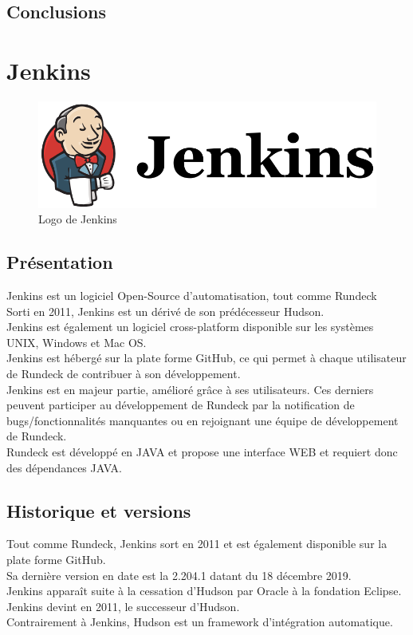 \documentclass[12pt]{article}
\begin{document}
\subsection{Conclusions}

\section{Jenkins}

\begin{figure}[ht]
    \includegraphics[scale=0.5]{images/jenkins.png}
    \caption{Logo de Jenkins}
\end{figure}

\subsection{Présentation}

Jenkins est un logiciel Open-Source d'automatisation, tout comme Rundeck
\\
Sorti en 2011, Jenkins est un dérivé de son prédécesseur Hudson.
\\
Jenkins est également un logiciel cross-platform disponible sur les systèmes UNIX, Windows et Mac OS. 
\\
Jenkins est hébergé sur la plate forme GitHub, ce qui permet à chaque utilisateur de Rundeck de contribuer à son développement. 
\\
Jenkins est en majeur partie, amélioré grâce à ses utilisateurs. Ces derniers peuvent participer au développement de Rundeck par la notification de bugs/fonctionnalités manquantes ou en rejoignant une équipe de développement de Rundeck. 
\\
Rundeck est développé en JAVA et propose une interface WEB et requiert donc des dépendances JAVA.

\subsection{Historique et versions}

Tout comme Rundeck, Jenkins sort en 2011 et est également disponible sur la plate forme GitHub.
\\
Sa dernière version en date est la 2.204.1 datant du 18 décembre 2019.
\\
Jenkins apparaît suite à la cessation d'Hudson par Oracle à la fondation Eclipse. Jenkins devint en 2011, le successeur d'Hudson.
\\
Contrairement à Jenkins, Hudson est un framework d'intégration automatique.
\end{document}
